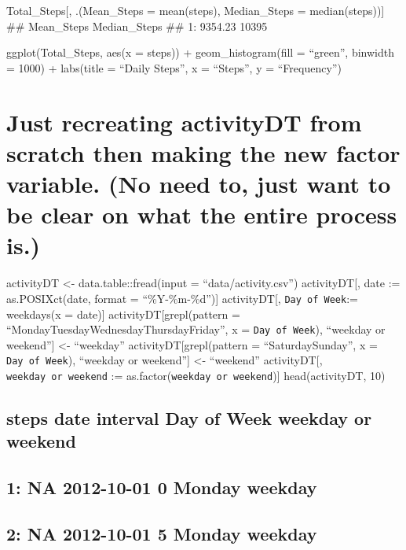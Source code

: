 \documentclass[
]{article}
\begin{document}
Total\_Steps{[}, .(Mean\_Steps = mean(steps), Median\_Steps =
median(steps)){]} \#\# Mean\_Steps Median\_Steps \#\# 1: 9354.23 10395

ggplot(Total\_Steps, aes(x = steps)) + geom\_histogram(fill = ``green'',
binwidth = 1000) + labs(title = ``Daily Steps'', x = ``Steps'', y =
``Frequency'')

\hypertarget{just-recreating-activitydt-from-scratch-then-making-the-new-factor-variable.-no-need-to-just-want-to-be-clear-on-what-the-entire-process-is.}{%
\section{Just recreating activityDT from scratch then making the new
factor variable. (No need to, just want to be clear on what the entire
process
is.)}\label{just-recreating-activitydt-from-scratch-then-making-the-new-factor-variable.-no-need-to-just-want-to-be-clear-on-what-the-entire-process-is.}}

activityDT \textless- data.table::fread(input = ``data/activity.csv'')
activityDT{[}, date := as.POSIXct(date, format = ``\%Y-\%m-\%d''){]}
activityDT{[}, \texttt{Day\ of\ Week}:= weekdays(x = date){]}
activityDT{[}grepl(pattern =
``Monday\textbar Tuesday\textbar Wednesday\textbar Thursday\textbar Friday'',
x = \texttt{Day\ of\ Week}), ``weekday or weekend''{]} \textless-
``weekday'' activityDT{[}grepl(pattern = ``Saturday\textbar Sunday'', x
= \texttt{Day\ of\ Week}), ``weekday or weekend''{]} \textless-
``weekend'' activityDT{[}, \texttt{weekday\ or\ weekend} :=
as.factor(\texttt{weekday\ or\ weekend}){]} head(activityDT, 10)

\hypertarget{steps-date-interval-day-of-week-weekday-or-weekend}{%
\subsection{steps date interval Day of Week weekday or
weekend}\label{steps-date-interval-day-of-week-weekday-or-weekend}}

\hypertarget{na-2012-10-01-0-monday-weekday}{%
\subsection{1: NA 2012-10-01 0 Monday
weekday}\label{na-2012-10-01-0-monday-weekday}}

\hypertarget{na-2012-10-01-5-monday-weekday}{%
\subsection{2: NA 2012-10-01 5 Monday
weekday}\label{na-2012-10-01-5-monday-weekday}}
\end{document}
